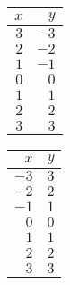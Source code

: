 \documentclass[12pt]{article}
\theoremstyle{definition}
\begin{document}
\begin{multicols}{4}
\begin{tabular}{r|r}
$x$ & $y$\\
\hline
$3$ & $-3$\\
$2$ & $-2$\\
$1$ & $-1$\\
$0$ & $0$\\
$1$ & $1$\\
$2$ & $2$\\
$3$ & $3$
\end{tabular}
\hspace{1in}

\begin{tabular}{r|r}
$x$ & $y$\\
\hline
$-3$ & $3$\\
$-2$ & $2$\\
$-1$ & $1$\\
$0$ & $0$\\
$1$ & $1$\\
$2$ & $2$\\
$3$ & $3$
\end{tabular}
\hspace{1in}


\end{multicols}
\end{document}

